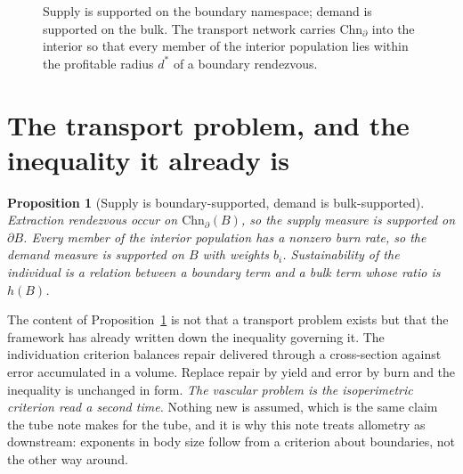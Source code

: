\documentclass[11pt]{article}
\theoremstyle{plain}
\newtheorem{proposition}[theorem]{Proposition}
\theoremstyle{definition}
\newcommand{\Chn}{\mathrm{Chn}}
\begin{document}
\begin{figure}[t]
\centering
{}
\caption{Supply is supported on the boundary namespace; demand is supported on the bulk. The
transport network carries $\Chn_{\partial}$ into the interior so that every member of the interior
population lies within the profitable radius $d^{*}$ of a boundary rendezvous.}
\label{fig:three}
\end{figure}

\section{The transport problem, and the inequality it already is}
\label{sec:problem}

\begin{proposition}[Supply is boundary-supported, demand is bulk-supported]
\label{prop:J}
Extraction rendezvous occur on $\Chn_{\partial}(B)$, so the supply measure is supported on $\partial
B$. Every member of the interior population has a nonzero burn rate, so the demand measure is
supported on $B$ with weights $b_i$. Sustainability of the individual is a relation between a
boundary term and a bulk term whose ratio is $h(B)$.
\end{proposition}

The content of Proposition~\ref{prop:J} is not that a transport problem exists but that the framework
has already written down the inequality governing it. The individuation criterion balances repair
delivered through a cross-section against error accumulated in a volume. Replace repair by yield and
error by burn and the inequality is unchanged in form. \emph{The vascular problem is the
isoperimetric criterion read a second time.} Nothing new is assumed, which is the same claim the tube
note makes for the tube, and it is why this note treats allometry as downstream: exponents in body
size follow from a criterion about boundaries, not the other way around.
\end{document}
